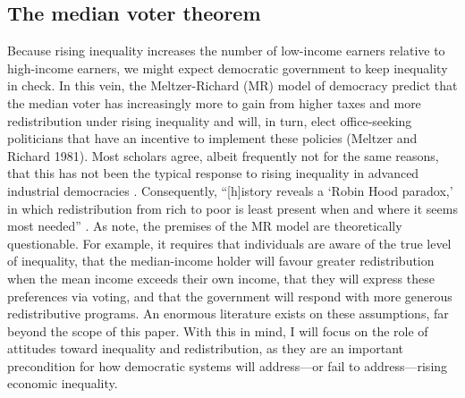 \documentclass[12pt, letter]{scrartcl}
\begin{document}
\subsection{The median voter theorem}

Because rising inequality increases the number of low-income earners relative to high-income earners, we might expect democratic government to keep inequality in check. In this vein, the Meltzer-Richard (MR) model of democracy predict that the median voter has increasingly more to gain from higher taxes and more redistribution under rising inequality and will, in turn, elect office-seeking politicians that have an incentive to implement these policies (Meltzer and Richard 1981). Most scholars agree, albeit frequently not for the same reasons, that this has not been the typical response to rising inequality in advanced industrial democracies \parencite{kenworthy2005rising, iversen2009distribution, bradley2003distribution}. Consequently, “[h]istory reveals a `Robin Hood paradox,' in which redistribution from rich to poor is least present when and where it seems most needed” \parencite{lindert2004growing}. As \textcite[36]{kenworthy2007inequality} note, the premises of the MR model are theoretically questionable. For example, it requires that individuals are aware of the true level of inequality, that the median-income holder will favour greater redistribution when the mean income exceeds their own income, that they will express these preferences via voting, and that the government will respond with more generous redistributive programs. An enormous literature exists on these assumptions, far beyond the scope of this paper. With this in mind, I will focus on the role of attitudes toward inequality and redistribution, as they are an important precondition for how democratic systems will address---or fail to address---rising economic inequality. 

\vspace{15pt}
\singlespacing
\end{document}
